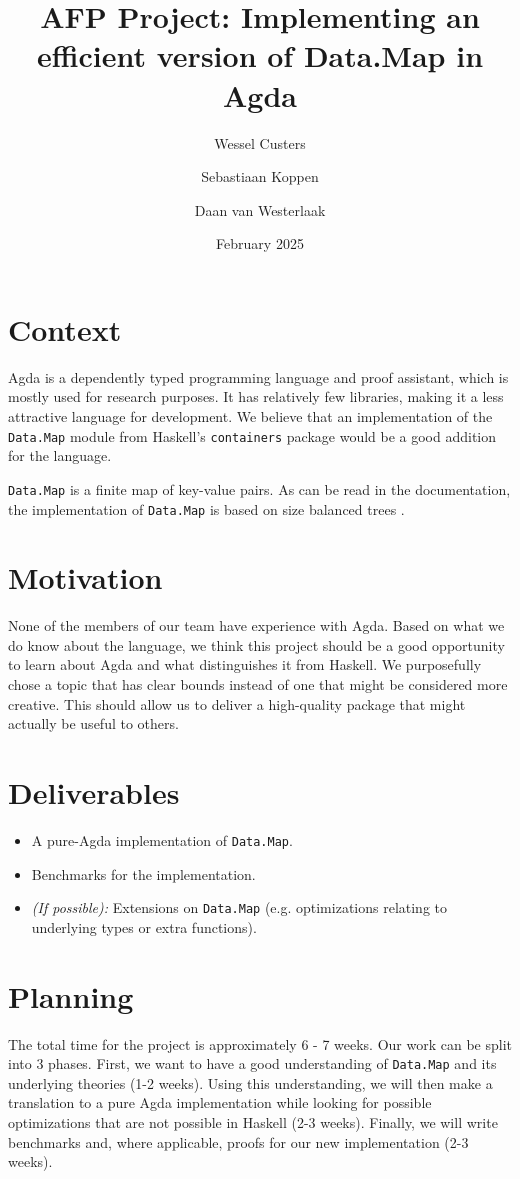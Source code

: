 \documentclass[a4paper,UKenglish,cleveref, autoref, thm-restate]{template/lipics-v2021}
\title{AFP Project: Implementing an efficient version of Data.Map in Agda}
\author{Wessel Custers}{Utrecht University, Netherlands}{}{}{}
\author{Sebastiaan Koppen}{Utrecht University, Netherlands}{}{}{}
\author{Daan van Westerlaak}{Utrecht University, Netherlands}{}{}{}
\date{February 2025}
\begin{document}
\maketitle

\section{Context}
Agda is a dependently typed programming language and proof assistant, which is mostly used for research purposes. It has relatively few libraries, making it a less attractive language for development. We believe that an implementation of the \texttt{Data.Map} module from Haskell's \texttt{containers} package would be a good addition for the language.

\texttt{Data.Map} is a finite map of key-value pairs. As can be read in the documentation, the implementation of \texttt{Data.Map} is based on size balanced trees \cite{adams1993functional, nievergelt1972binary}.

\section{Motivation}
None of the members of our team have experience with Agda. Based on what we do know about the language, we think this project should be a good opportunity to learn about Agda and what distinguishes it from Haskell. We purposefully chose a topic that has clear bounds instead of one that might be considered more creative. This should allow us to deliver a high-quality package that might actually be useful to others.

\section{Deliverables}
\begin{itemize}
    \item A pure-Agda implementation of \texttt{Data.Map}.
    \item Benchmarks for the implementation.
    \item \textit{(If possible):} Extensions on \texttt{Data.Map} (e.g. optimizations relating to underlying types or extra functions).
\end{itemize}

\section{Planning}
The total time for the project is approximately 6 - 7 weeks. Our work can be split into 3 phases. First, we want to have a good understanding of \texttt{Data.Map} and its underlying theories (1-2 weeks). Using this understanding, we will then make a translation to a pure Agda implementation while looking for possible optimizations that are not possible in Haskell (2-3 weeks). Finally, we will write benchmarks and, where applicable, proofs for our new implementation (2-3 weeks).



\end{document}
